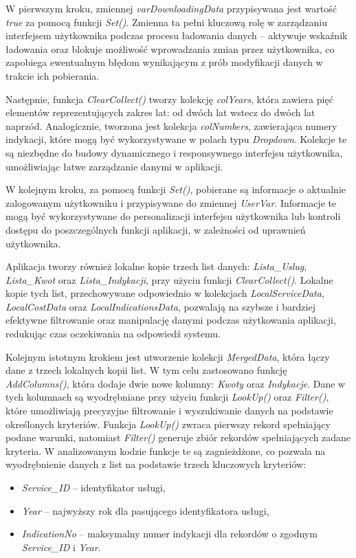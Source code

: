 W pierwszym kroku, zmiennej \emph{varDownloadingData} przypisywana jest wartość \emph{true} za pomocą funkcji \emph{Set()}. Zmienna ta pełni kluczową rolę w zarządzaniu interfejsem użytkownika podczas procesu ładowania danych – aktywuje wskaźnik ładowania oraz blokuje możliwość wprowadzania zmian przez użytkownika, co zapobiega ewentualnym błędom wynikającym z prób modyfikacji danych w trakcie ich pobierania.

Następnie, funkcja \emph{ClearCollect()} tworzy kolekcję \emph{colYears}, która zawiera pięć elementów reprezentujących zakres lat: od dwóch lat wstecz do dwóch lat naprzód. Analogicznie, tworzona jest kolekcja \emph{colNumbers}, zawierająca numery indykacji, które mogą być wykorzystywane w polach typu \emph{Dropdown}. Kolekcje te są niezbędne do budowy dynamicznego i responsywnego interfejsu użytkownika, umożliwiając łatwe zarządzanie danymi w aplikacji.

W kolejnym kroku, za pomocą funkcji \emph{Set()}, pobierane są informacje o aktualnie zalogowanym użytkowniku i przypisywane do zmiennej \emph{UserVar}. Informacje te mogą być wykorzystywane do personalizacji interfejsu użytkownika lub kontroli dostępu do poszczególnych funkcji aplikacji, w zależności od uprawnień użytkownika.

Aplikacja tworzy również lokalne kopie trzech list danych: \emph{Lista\_Uslug}, \emph{Lista\_Kwot} oraz \emph{Lista\_Indykacji}, przy użyciu funkcji \emph{ClearCollect()}. Lokalne kopie tych list, przechowywane odpowiednio w kolekcjach \emph{LocalServiceData}, \emph{LocalCostData} oraz \emph{LocalIndicationsData}, pozwalają na szybsze i bardziej efektywne filtrowanie oraz manipulację danymi podczas użytkowania aplikacji, redukując czas oczekiwania na odpowiedź systemu.

Kolejnym istotnym krokiem jest utworzenie kolekcji \emph{MergedData}, która łączy dane z trzech lokalnych kopii list. W tym celu zastosowano funkcję \emph{AddColumns()}, która dodaje dwie nowe kolumny: \emph{Kwoty} oraz \emph{Indykacje}. Dane w tych kolumnach są wyodrębniane przy użyciu funkcji \emph{LookUp()} oraz \emph{Filter()}, które umożliwiają precyzyjne filtrowanie i wyszukiwanie danych na podstawie określonych kryteriów. Funkcja \emph{LookUp()} zwraca pierwszy rekord spełniający podane warunki, natomiast \emph{Filter()} generuje zbiór rekordów spełniających zadane kryteria. W analizowanym kodzie funkcje te są zagnieżdżone, co pozwala na wyodrębnienie danych z list na podstawie trzech kluczowych kryteriów:
\begin{itemize}
    \item \emph{Service\_ID} – identyfikator usługi,
    \item \emph{Year} – najwyższy rok dla pasującego identyfikatora usługi,
    \item \emph{IndicationNo} – maksymalny numer indykacji dla rekordów o zgodnym \emph{Service\_ID} i \emph{Year}.
\end{itemize}

